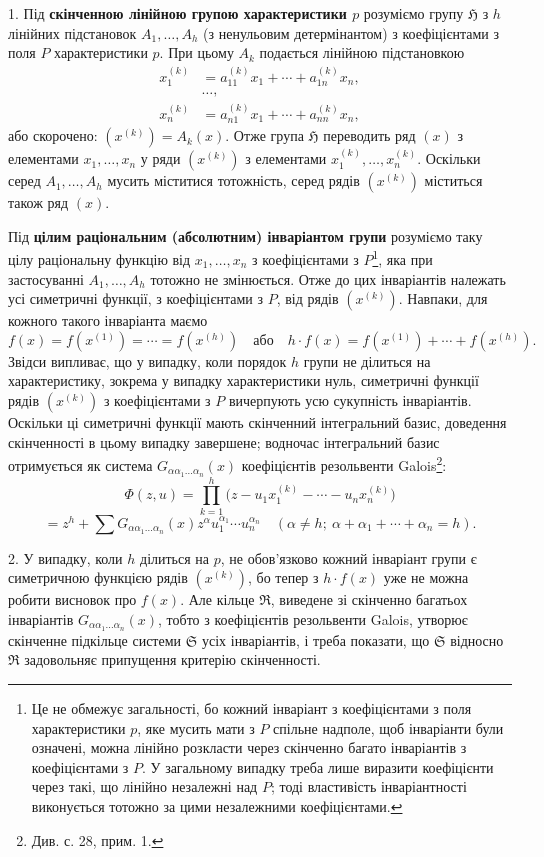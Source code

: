 \documentclass[11pt]{article}
\begin{document}
1. Під \textbf{скінченною лінійною групою характеристики $p$} розуміємо групу $\mathfrak H$ з $h$ лінійних підстановок $A_1,\ldots,A_h$ (з ненульовим детермінантом) з коефіцієнтами з поля $P$ характеристики $p$. При цьому $A_k$ подається лінійною підстановкою
\[
\begin{aligned}
 x_1^{(k)}&=a_{11}^{(k)}x_1+\cdots+a_{1n}^{(k)}x_n,\\[-0.2em]
 &\ldots,\\
 x_n^{(k)}&=a_{n1}^{(k)}x_1+\cdots+a_{nn}^{(k)}x_n,
\end{aligned}
\]
або скорочено: $(x^{(k)})=A_k(x)$. Отже група $\mathfrak H$ переводить ряд $(x)$ з елементами $x_1,\ldots,x_n$ у ряди $(x^{(k)})$ з елементами $x_1^{(k)},\ldots,x_n^{(k)}$. Оскільки серед $A_1,\ldots,A_h$ мусить міститися тотожність, серед рядів $(x^{(k)})$ міститься також ряд $(x)$.

Під \textbf{цілим раціональним (абсолютним) інваріантом групи} розуміємо таку цілу раціональну функцію від $x_1,\ldots,x_n$ з коефіцієнтами з $P$\footnote{Це не обмежує загальності, бо кожний інваріант з коефіцієнтами з поля характеристики $p$, яке мусить мати з $P$ спільне надполе, щоб інваріанти були означені, можна лінійно розкласти через скінченно багато інваріантів з коефіцієнтами з $P$. У загальному випадку треба лише виразити коефіцієнти через такі, що лінійно незалежні над $P$; тоді властивість інваріантності виконується тотожно за цими незалежними коефіцієнтами.}, яка при застосуванні $A_1,\ldots,A_h$ тотожно не змінюється. Отже до цих інваріантів належать усі симетричні функції, з коефіцієнтами з $P$, від рядів $(x^{(k)})$. Навпаки, для кожного такого інваріанта маємо
\[
 f(x)=f(x^{(1)})=\cdots=f(x^{(h)})
 \quad\text{або}\quad
 h\cdot f(x)=f(x^{(1)})+\cdots+f(x^{(h)}).
\]
Звідси випливає, що у випадку, коли порядок $h$ групи не ділиться на характеристику, зокрема у випадку характеристики нуль, симетричні функції рядів $(x^{(k)})$ з коефіцієнтами з $P$ вичерпують усю сукупність інваріантів. Оскільки ці симетричні функції мають скінченний інтегральний базис, доведення скінченності в цьому випадку завершене; водночас інтегральний базис отримується як система $G_{\alpha\alpha_1\ldots\alpha_n}(x)$ коефіцієнтів резольвенти Galois\footnote{Див. с. 28, прим. 1.}:
\[
 \Phi(z,u)=\prod_{k=1}^{h}\bigl(z-u_1x_1^{(k)}-\cdots-u_nx_n^{(k)}\bigr)
\]
\[
 =z^h+\sum G_{\alpha\alpha_1\ldots\alpha_n}(x)
 z^{\alpha}u_1^{\alpha_1}\cdots u_n^{\alpha_n}
 \quad(\alpha\ne h;\ \alpha+\alpha_1+\cdots+\alpha_n=h).
\]

2. У випадку, коли $h$ ділиться на $p$, не обов'язково кожний інваріант групи є симетричною функцією рядів $(x^{(k)})$, бо тепер з $h\cdot f(x)$ уже не можна робити висновок про $f(x)$. Але кільце $\mathfrak R$, виведене зі скінченно багатьох інваріантів $G_{\alpha\alpha_1\ldots\alpha_n}(x)$, тобто з коефіцієнтів резольвенти Galois, утворює скінченне підкільце системи $\mathfrak S$ усіх інваріантів, і треба показати, що $\mathfrak S$ відносно $\mathfrak R$ задовольняє припущення критерію скінченності.
\end{document}
